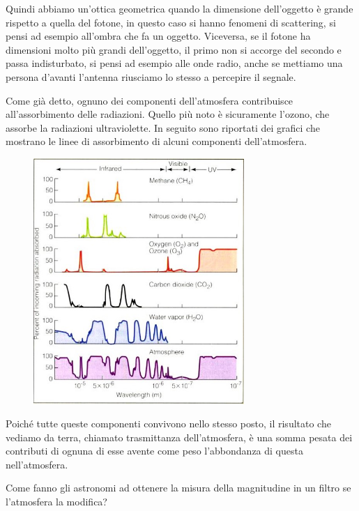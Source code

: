 Quindi abbiamo un'ottica geometrica quando la dimensione dell'oggetto è grande rispetto a quella del fotone, in questo caso si hanno fenomeni di scattering, si pensi ad esempio all'ombra che fa un oggetto. Viceversa, se il fotone ha dimensioni molto più grandi dell'oggetto, il primo non si accorge del secondo e passa indisturbato, si pensi ad esempio alle onde radio, anche se mettiamo una persona d'avanti l'antenna riusciamo lo stesso a percepire il segnale.

Come già detto, ognuno dei componenti dell'atmosfera contribuisce all'assorbimento delle radiazioni. Quello più noto è sicuramente l'ozono, che assorbe la radiazioni ultraviolette. In seguito sono riportati dei grafici che mostrano le linee di assorbimento di alcuni componenti dell'atmosfera.

\begin{figure}[H]
   \centering
   \includegraphics[width=8cm]{righe ass atm.jpg}
   \label{fig:righe_ass_atm}
\end{figure}

Poiché tutte queste componenti convivono nello stesso posto, il risultato che vediamo da terra, chiamato trasmittanza dell'atmosfera, è una somma pesata dei contributi di ognuna di esse avente come peso l'abbondanza di questa nell'atmosfera.

\vspace{0.2cm}Come fanno gli astronomi ad ottenere la misura della magnitudine in un filtro se l'atmosfera la modifica?

\begin{figure}[H]
   \centering
\end{figure}

